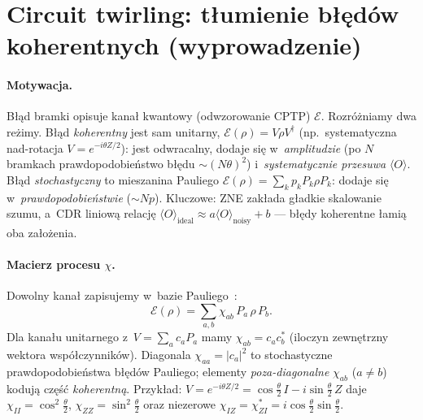 \documentclass[11pt,a4paper]{article}
\begin{document}
\section{Circuit twirling: tłumienie błędów koherentnych (wyprowadzenie)}

\paragraph{Motywacja.} Błąd bramki opisuje kanał kwantowy (odwzorowanie CPTP)
$\mathcal{E}$. Rozróżniamy dwa reżimy. Błąd \emph{koherentny} jest sam unitarny,
$\mathcal{E}(\rho)=V\rho V^\dagger$ (np.\ systematyczna nad-rotacja
$V=e^{-i\theta Z/2}$): jest odwracalny, dodaje się w~\emph{amplitudzie}
(po $N$ bramkach prawdopodobieństwo błędu $\sim(N\theta)^2$) i~\emph{systematycznie
przesuwa} $\langle O\rangle$. Błąd \emph{stochastyczny} to mieszanina Pauliego
$\mathcal{E}(\rho)=\sum_k p_k P_k\rho P_k$: dodaje się w~\emph{prawdopodobieństwie}
($\sim Np$). Kluczowe: ZNE zakłada gładkie skalowanie szumu, a~CDR liniową relację
$\langle O\rangle_{\text{ideal}}\!\approx\!a\langle O\rangle_{\text{noisy}}+b$ ---
błędy koherentne łamią oba założenia.

\paragraph{Macierz procesu $\chi$.} Dowolny kanał zapisujemy w~bazie Pauliego~\cite{nielsen2010}:
\begin{equation}
\mathcal{E}(\rho)=\sum_{a,b}\chi_{ab}\,P_a\,\rho\,P_b .
\end{equation}
Dla kanału unitarnego z~$V=\sum_a c_a P_a$ mamy $\chi_{ab}=c_a c_b^{*}$ (iloczyn
zewnętrzny wektora współczynników). Diagonala $\chi_{aa}=|c_a|^2$ to stochastyczne
prawdopodobieństwa błędów Pauliego; elementy \emph{poza-diagonalne} $\chi_{ab}$
($a\neq b$) kodują część \emph{koherentną}. Przykład: $V=e^{-i\theta Z/2}
=\cos\tfrac\theta2\,I-i\sin\tfrac\theta2\,Z$ daje
$\chi_{II}=\cos^2\tfrac\theta2$, $\chi_{ZZ}=\sin^2\tfrac\theta2$ oraz
niezerowe $\chi_{IZ}=\chi_{ZI}^{*}=i\cos\tfrac\theta2\sin\tfrac\theta2$.
\end{document}
